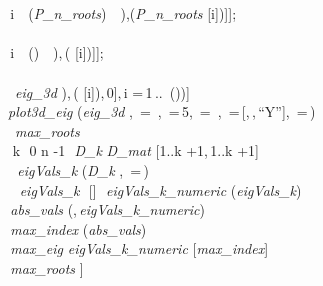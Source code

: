 \documentclass{article}
\begin{document}
{  \coloneqq []\colon 
\\
  \coloneqq []\colon 
\\
 \,i \,\, (\textit{P\_n\_roots})\, \, \coloneqq [\mathit{op} (\mathit{points}),\,[\Re (\textit{P\_n\_roots} [i]),\Im (\textit{P\_n\_roots} [i])]];
\\
 \,\colon 
\\
 \,i \,\, ()\, \, \coloneqq [\mathit{op} (\mathit{eig}),\,[\Re (\mathit{eigVals} [i]),\,\Im ( [i])]];
\\
 \,\colon 
\\
  \, \textit{eig\_3d} \coloneqq [\mathit{seq} ([\Re (\mathit{eigVals} [i]),\,\Im ( [i]),\,0],\,i =\,1\,..\, ())]\colon 
\\
 \textit{plot3d\_eig} \coloneqq {} (\textit{eig\_3d} ,\, =\, ,\, =\,5,\, =\, ,\, =\,[,\,,\,``Y''],\, =\,)\colon 
\\
 \, \textit{max\_roots} \coloneqq []\colon 
\\
 \,\,k \,\,0\,\,n -1\, \,\textit{D\_k} \coloneqq \textit{D\_mat} [1..k +1,\,1..k +1]\colon 
\\
 \, \,\textit{eigVals\_k} \coloneqq {} (\textit{D\_k} ,\, =\,)\colon 
\\
 \, \,\,\textit{eigVals\_k} \,\neq \,[]\, \,\textit{eigVals\_k\_numeric} \coloneqq {} (\textit{eigVals\_k})\colon 
\\
 \,\textit{abs\_vals} \coloneqq {} (,\,\textit{eigVals\_k\_numeric})\colon 
\\
 \,\textit{max\_index} \coloneqq {}(\textit{abs\_vals})\colon 
\\
 \,\textit{max\_eig} \coloneqq \textit{eigVals\_k\_numeric} [\textit{max\_index}]\colon 
\\
 \,\textit{max\_roots} \coloneqq [\mathit{op} (\textit{max\_roots}),\,[\Re (\textit{max\_eig}),\,\Im (\textit{max\_eig})]]\colon 
\\
 \,\,\colon 
\\
}
\end{document}
